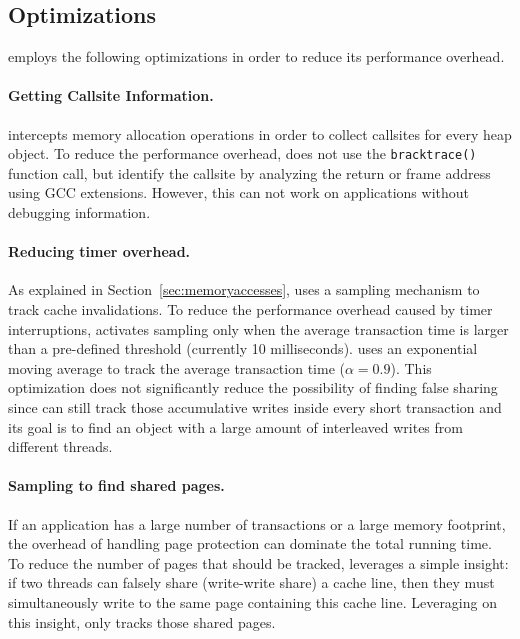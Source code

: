 \subsection{Optimizations}

\SheriffDetect{} employs the following optimizations in order to reduce its performance overhead. 

\paragraph{Getting Callsite Information.}
\SheriffDetect{} intercepts memory allocation operations in order to collect callsites for every heap object. To reduce the performance overhead, \SheriffDetect{} does not use the \texttt{bracktrace()} function call, but identify the callsite by analyzing the return or frame address using GCC extensions. However, this can not work on applications without debugging information. 

\paragraph{Reducing timer overhead.}
As explained in Section~\ref{sec:memoryaccesses}, \SheriffDetect{} uses a sampling mechanism to track cache invalidations. To reduce the performance overhead caused by timer interruptions, \SheriffDetect{} activates sampling only when the average transaction time is larger than a pre-defined threshold (currently 10 milliseconds). \SheriffDetect{} uses an exponential moving average to track the average transaction time ($\alpha = 0.9$). This optimization does not significantly reduce the possibility of finding false sharing since \SheriffDetect{} can still track those accumulative writes inside every short transaction and its goal is to find an object with a large amount of interleaved writes from different threads.

\paragraph{Sampling to find shared pages.} 
If an application has a large number of transactions or a large memory footprint, the overhead of handling page protection can dominate the total running time.
To reduce the number of pages that should be tracked, \SheriffDetect{} leverages a
simple insight: if two threads can falsely share (write-write share) a cache line, then they must simultaneously write to the same page containing this cache line. 
Leveraging on this insight, \SheriffDetect{} only tracks those shared pages. 

